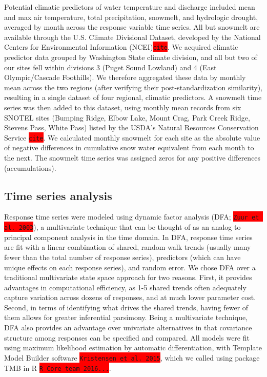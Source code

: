 \documentclass{article}
\begin{document}
Potential climatic predictors of water temperature and discharge included mean and max air temperature, total precipitation, snowmelt, and hydrologic drought, averaged by month across the response variable time series. All but snowmelt are available through the U.S. Climate Divisional Dataset, developed by the National Centers for Environmental Information (NCEI)\colorbox{red}{\lstinline{cite}}. We acquired climatic predictor data grouped by Washington State climate division, and all but two of our sites fell within divisions 3 (Puget Sound Lowland) and 4 (East Olympic/Cascade Foothills). We therefore aggregated these data by monthly mean across the two regions (after verifying their post-standardization similarity), resulting in a single dataset of four regional, climatic predictors. A snowmelt time series was then added to this dataset, using monthly mean records from six SNOTEL sites (Bumping Ridge, Elbow Lake, Mount Crag, Park Creek Ridge, Stevens Pass, White Pass) listed by the USDA's Natural Resources Conservation Service \colorbox{red}{\lstinline{cite}}. We calculated monthly snowmelt for each site as the absolute value of negative differences in cumulative snow water equivalent from each month to the next. The snowmelt time series was assigned zeros for any positive differences (accumulations). 


\subsection*{Time series analysis}

Response time series were modeled using dynamic factor analysis (DFA; \colorbox{red}{\lstinline{Zuur et al. 2003}}), a multivariate technique that can be thought of as an analog to principal component analysis in the time domain. In DFA, response time series are fit with a linear combination of shared, random-walk trends (usually many fewer than the total number of response series), predictors (which can have unique effects on each response series), and random error. We chose DFA over a traditional multivariate state space approach for two reasons. First, it provides advantages in computational efficiency, as 1-5 shared trends often adequately capture variation across dozens of responses, and at much lower parameter cost. Second, in terms of identifying what drives the shared trends, having fewer of them allows for greater inferential parsimony. Being a multivariate technique, DFA also provides an advantage over univariate alternatives in that covariance structure among responses can be specified and compared. All models were fit using maximum likelihood estimation by automatic differentiation, with Template Model Builder software \colorbox{red}{\lstinline{Kristensen et al. 2015}}, which we called using package TMB in R \colorbox{red}{\lstinline{R Core team 2016...}}.
\end{document}

